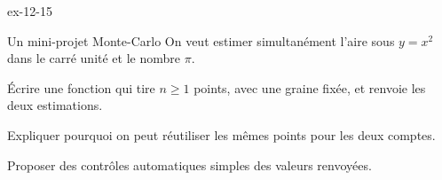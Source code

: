 \begin{blocLivre}{ex-12-15}
\begin{exercice}[3]{Un mini-projet Monte-Carlo}
On veut estimer simultanément l’aire sous $y=x^2$ dans le carré unité et le nombre $\pi$.\begin{questions}
\item Écrire une fonction qui tire $n\geq1$ points, avec une graine fixée, et renvoie les deux estimations.
\item Expliquer pourquoi on peut réutiliser les mêmes points pour les deux comptes.
\item Proposer des contrôles automatiques simples des valeurs renvoyées.
\end{questions}
\label{figlivre-r12-15-zones-ex}

\end{exercice}
\end{blocLivre}

